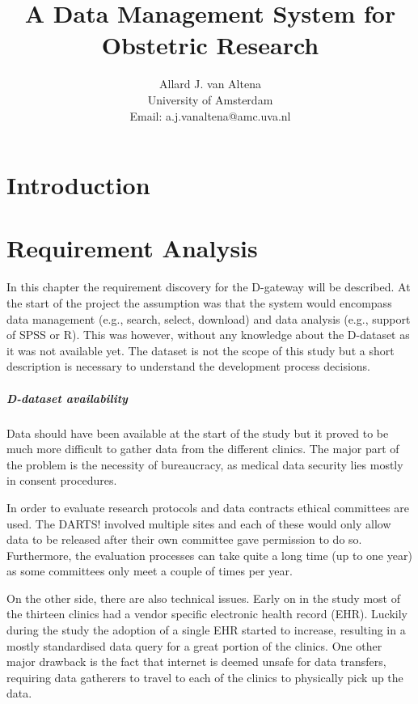 \documentclass[a4paper]{report}
\title{A Data Management System for Obstetric Research}
\author{
	Allard J. van Altena\\
	University of Amsterdam\\
	Email: a.j.vanaltena@amc.uva.nl
}
\newcommand{\eg}{e.g.,}
\newcommand{\project}{DARTS!}
\newcommand{\projectdata}{D-dataset}
\newcommand{\ivfsystem}{D-gateway}
\begin{document}
	
	\tableofcontents
	
	\chapter{Introduction}
	\label{introduction}
	
	
	
	
	
	\chapter{Requirement Analysis}
	\label{requirements}
	
	In this chapter the requirement discovery for the \ivfsystem{} will be described.
	At the start of the project the assumption was that the system would encompass data management (\eg{} search, select, download) and data analysis (\eg{} support of SPSS or R).
	This was however, without any knowledge about the \projectdata{} as it was not available yet.
	The dataset is not the scope of this study but a short description is necessary to understand the development process decisions.
	
	\paragraph{\projectdata{} availability}
	Data should have been available at the start of the study but it proved to be much more difficult to gather data from the different clinics.
	The major part of the problem is the necessity of bureaucracy, as medical data security lies mostly in consent procedures.
	
	In order to evaluate research protocols and data contracts ethical committees are used.
	The \project{} involved multiple sites and each of these would only allow data to be released after their own committee gave permission to do so.
	Furthermore, the evaluation processes can take quite a long time (up to one year) as some committees only meet a couple of times per year.
	
	On the other side, there are also technical issues.
	Early on in the study most of the thirteen clinics had a vendor specific electronic health record (EHR).
	Luckily during the study the adoption of a single EHR started to increase, resulting in a mostly standardised data query for a great portion of the clinics.
	One other major drawback is the fact that internet is deemed unsafe for data transfers, requiring data gatherers to travel to each of the clinics to physically pick up the data.
	
\end{document}
